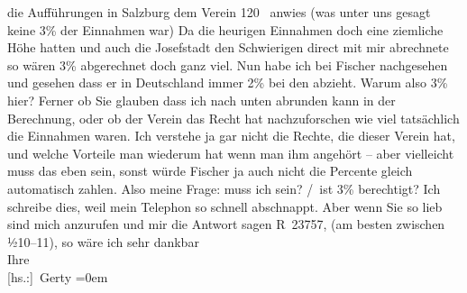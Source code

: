 \begin{ledgroupsized}[t]{13cm}
                    die Aufführungen in Salzburg dem Verein
                        120 \label{K_L02525_1v}\label{K_L02525_1h} anwies (was unter uns gesagt keine 3{\%} der Einnahmen war) Da die heurigen Einnahmen doch
                    eine ziemliche Höhe hatten und auch die Josefstadt den Schwierigen direct
                    mit mir abrechnete so wären 3{\%}{ } abgerechnet doch ganz
                    viel.\pend
           \pstart
           Nun habe ich bei Fischer nachgesehen und gesehen
                    dass er in Deutschland immer 2{\%} bei den \label{T_L02525_1v}\label{T_L02525_1h} abzieht. Warum also 3{\%} hier? Ferner ob Sie glauben dass ich nach unten
                    abrunden kann in der Berechnung, oder ob der Verein das Recht hat nachzuforschen wie viel tatsächlich
                    die Einnahmen waren. Ich verstehe ja gar nicht die Rechte, die dieser Verein hat, und welche
                    Vorteile man wiederum hat wenn man ihm angehört – aber vielleicht muss das eben
                    sein, sonst würde Fischer ja auch nicht die Percente gleich automatisch
                    zahlen.\pend
           \pstart
           Also meine Frage: muss ich  sein?\pend
           / ist 3{\%} berechtigt?\pend
           \pstart
           Ich schreibe dies, weil mein Telephon so schnell abschnappt. Aber wenn Sie so
                    lieb sind mich anzurufen und mir die Antwort sagen R 23757, (am besten zwischen
                        ½10–11), so wäre ich sehr dankbar\pend
           \pstart
           \label{T_L02525_2v}\label{T_L02525_2h}{\\[\baselineskip]}Ihre{\\[\baselineskip]}\spacefill\mbox{{[}hs.:{]} Gerty}\pend
           \leftskip=0em{}\endnumbering{}\end{ledgroupsized}  \newcommand{\dateiname}{L02525}\newcommand{\titel}{Gerty von Hofmannsthal an Arthur Schnitzler, 23. 11. 1929}\newcommand{\editorInnen}{Martin Anton Müller und Gerd-Hermann Susen}
      